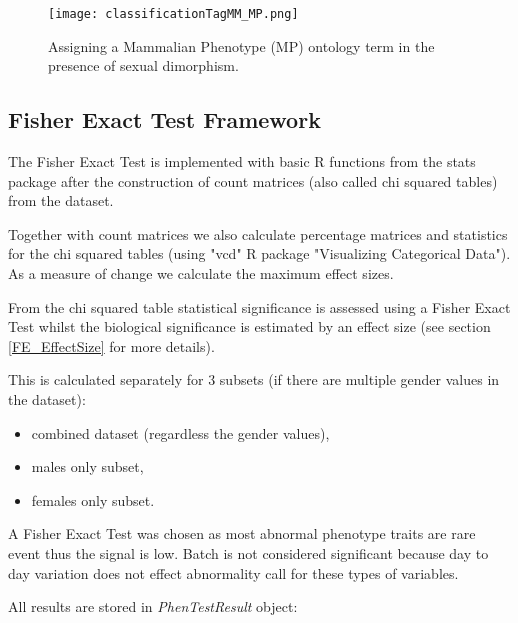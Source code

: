 \documentclass[12pt,a4paper]{article}
\begin{document}
\begin{figure}[!tpb]%
\centerline{\texttt{[image: classificationTagMM\_MP.png]}}
\caption{Assigning a Mammalian Phenotype (MP) ontology term in the presence of sexual dimorphism. }\label{fig:05_2}
\end{figure}
 
\subsection{Fisher Exact Test Framework}
\label{section:FET}
The Fisher Exact Test is implemented with basic R functions from the stats package after the construction of count matrices (also called chi squared tables) from the dataset. 

Together with count matrices we also calculate percentage matrices and statistics for the chi squared tables (using "vcd" R package "Visualizing Categorical Data").  As a measure of change we calculate the maximum effect sizes. 

From the chi squared table statistical significance is assessed using a Fisher Exact Test whilst the biological significance is estimated by an effect size (see section \ref{FE_EffectSize} for more details).

This is calculated separately for 3 subsets (if there are multiple gender values in the dataset):
\begin{itemize}
 \item combined dataset (regardless the gender values),
 \item males only subset,
 \item females only subset.
\end{itemize}

A Fisher Exact Test was chosen as most abnormal phenotype traits are rare event thus the signal is low. Batch is not considered significant because day to day variation does not effect abnormality call for these types of variables.

All results are stored in \textit{PhenTestResult} object:
\end{document}

